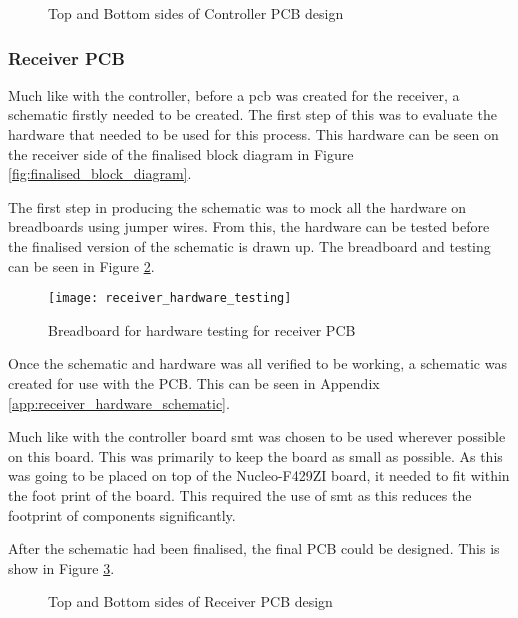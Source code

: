 \documentclass [12pt]{article}
\begin{document}
\begin{figure}[H]
\centering
{}
\caption{Top and Bottom sides of Controller PCB design}
\label{fig:finalised_PCB_design_controller}
\end{figure} 

\subsubsection{Receiver PCB}

Much like with the controller, before a \gls{pcb} was created for the receiver, a schematic firstly needed to be created. The first step of this was to evaluate the hardware that needed to be used for this process. This hardware can be seen on the receiver side of the finalised block diagram in Figure \ref{fig:finalised_block_diagram}.

The first step in producing the schematic was to mock all the hardware on breadboards using jumper wires. From this, the hardware can be tested before the finalised version of the schematic is drawn up. The breadboard and testing can be seen in Figure \ref{fig:receiver_hardware_testing}.

\begin{figure}[H]
\centerline{\texttt{[image: receiver\_hardware\_testing]}}
\caption{Breadboard for hardware testing for receiver PCB}
\label{fig:receiver_hardware_testing}
\end{figure}

Once the schematic and hardware was all verified to be working, a schematic was created for use with the PCB. This can be seen in Appendix \ref{app:receiver_hardware_schematic}.

Much like with the controller board \gls{smt} was chosen to be used wherever possible on this board. This was primarily to keep the board as small as possible. As this was going to be placed on top of the Nucleo-F429ZI board, it needed to fit within the foot print of the board. This required the use of \gls{smt} as this reduces the footprint of components significantly. 

After the schematic had been finalised, the final PCB could be designed. This is show in Figure \ref{fig:finalised_PCB_design_receiver}.

\begin{figure}[H]
\centering
{}
\caption{Top and Bottom sides of Receiver PCB design}
\label{fig:finalised_PCB_design_receiver}
\end{figure} 
\end{document}
